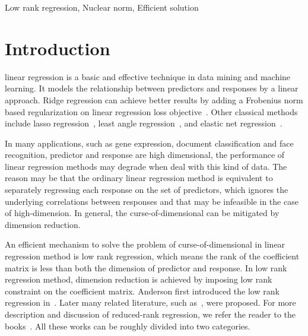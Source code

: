 \documentclass{ieeeaccess}
\begin{document}
\begin{keywords}
Low rank regression, Nuclear norm, Efficient solution
\end{keywords}

\titlepgskip=-15pt

\maketitle

\section{Introduction}
 linear regression is a basic and effective technique in data mining and machine learning. It models the relationship between predictors and responses by a linear approach. Ridge regression can achieve better results by adding a Frobenius norm based regularization on linear regression loss objective~\cite{ref20,ref21}. Other classical methods include lasso regression~\cite{ref22}, least angle regression~\cite{ref23}, and elastic net regression~\cite{ref24}.

In many applications, such as gene expression, document classification and face recognition, predictor and response are high dimensional, the performance of linear regression methods may degrade when deal with this kind of data. The reason may be that the ordinary linear regression method is equivalent to separately regressing each response on the set of predictors, which ignores the underlying correlations between responses and that may be infeasible in the case of high-dimension. In general, the curse-of-dimensional can be mitigated by dimension reduction.

An efficient mechanism to solve the problem of curse-of-dimensional in linear regression method is low rank regression, which means the rank of the coefficient matrix is less than both the dimension of predictor and response. In low rank regression method, dimension reduction is achieved by imposing low rank constraint on the coefficient matrix. Anderson first introduced the low rank regression in~\cite{ref01}. Later many related literature, such as~\cite{ref07,ref12,ref14}, were proposed. For more description and discussion of reduced-rank regression, we refer the reader to the books~\cite{ref30,ref31}. All these works can be roughly divided into two categories.
\end{document}
